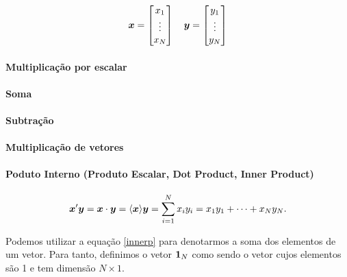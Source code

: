 \documentclass[11pt, oneside, a4paper, article]{article}
\numberwithin{equation}{section}
\begin{document}
\begin{description}
\begin{align*}
	\boldsymbol{x} = 
	\begin{bmatrix}
		x_{1} \\ \vdots \\ x_{N}	
	\end{bmatrix}
	\quad
	\boldsymbol{y} = 
	\begin{bmatrix}
		y_{1} \\ \vdots \\ y_{N}	
	\end{bmatrix}
\end{align*}

\paragraph{Multiplicação por escalar}

\paragraph{Soma}

\paragraph{Subtração}

\paragraph{Multiplicação de vetores}

\paragraph{Poduto Interno (Produto Escalar, Dot Product, Inner Product)}

\begin{align}\label{innerp}
	\boldsymbol{x}' \boldsymbol{y} = \boldsymbol{x} \cdot \boldsymbol{y} = \langle \boldsymbol{x} \rangle{\ensuremath{\boldsymbol{y}}} = \sum_{i=1}^{N} x_{i} y_{i} = x_{1}y_{1} + \dots + x_{N}y_{N}.
\end{align}

Podemos utilizar a equação \eqref{innerp} para denotarmos a soma dos elementos de um vetor.
Para tanto, definimos o vetor $\boldsymbol{1}_{N}$ como sendo o vetor cujos elementos são 1 e tem dimensão $N \times 1$.
\cite[p. 977, A.2.7]{greene-7ed}


\end{description}
\end{document}
